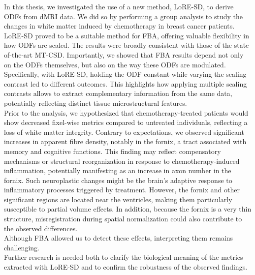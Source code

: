In this thesis, we investigated the use of a new method, LoRE-SD, to derive ODFs from dMRI data. We did so by performing a group analysis to study the changes in white matter induced by chemotherapy in breast cancer patients. LoRE-SD proved to be a suitable method for FBA, offering valuable flexibility in how ODFs are scaled. The results were broadly consistent with those of the state-of-the-art MT-CSD. Importantly, we showed that FBA results depend not only on the ODFs themselves, but also on the way these ODFs are modulated. Specifically, with LoRE-SD, holding the ODF constant while varying the scaling contrast led to different outcomes. This highlights how applying multiple scaling contrasts allows to extract complementary information from the same data, potentially reflecting distinct tissue microstructural features.
\\Prior to the analysis, we hypothesized that chemotherapy-treated patients would show decreased fixel-wise metrics compared to untreated individuals, reflecting a loss of white matter integrity. Contrary to expectations, we observed significant increases in apparent fibre density, notably in the fornix, a tract associated with memory and cognitive functions. This finding may reflect compensatory mechanisms or structural reorganization in response to chemotherapy-induced inflammation, potentially manifesting as an increase in axon number in the fornix. Such neuroplastic changes might be the brain's adaptive response to inflammatory processes triggered by treatment.
However, the fornix and other significant regions are located near the ventricles, making them particularly susceptible to partial volume effects. In addition, because the fornix is a very thin structure, misregistration during spatial normalization could also contribute to the observed differences. \\Although FBA allowed us to detect these effects, interpreting them remains challenging. 
\\Further research is needed both to clarify the biological meaning of the metrics extracted with LoRE-SD and to confirm the robustness of the observed findings.